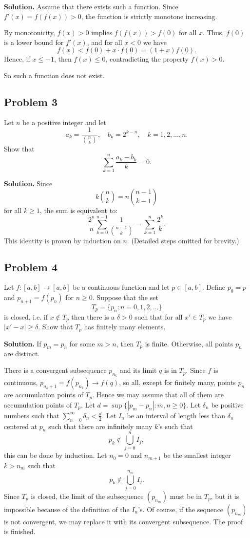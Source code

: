 \documentclass{article}
\begin{document}
\textbf{Solution.}
Assume that there exists such a function. Since $f'(x) = f(f(x)) > 0$,
the function is strictly monotone increasing.

By monotonicity, $f(x) > 0$ implies $f(f(x)) > f(0)$ for all $x$.
Thus, $f(0)$ is a lower bound for $f'(x)$, and for all $x < 0$ we have
\[
f(x) < f(0) + x \cdot f(0) = (1 + x)f(0).
\]
Hence, if $x \leq -1$, then $f(x) \leq 0$, contradicting the property $f(x) > 0$.

So such a function does not exist.

\subsection*{Problem 3}
Let $n$ be a positive integer and let
\[
a_k = \frac{1}{\binom{n}{k}}, \quad b_k = 2^{k-n}, \quad k = 1, 2, \ldots, n.
\]
Show that
\[
\sum_{k=1}^{n} \frac{a_k - b_k}{k} = 0.
\]

\textbf{Solution.}
Since
\[
k \binom{n}{k} = n \binom{n-1}{k-1}
\]
for all $k \geq 1$, the sum is equivalent to:
\[
\frac{2^n}{n} \sum_{k=0}^{n-1} \frac{1}{\binom{n-1}{k}} = \sum_{k=1}^{n} \frac{2^k}{k}.
\]
This identity is proven by induction on $n$. (Detailed steps omitted for brevity.)

\subsection*{Problem 4}
Let $f: [a, b] \to [a, b]$ be a continuous function and let $p \in [a, b]$.
Define $p_0 = p$ and $p_{n+1} = f(p_n)$ for $n \geq 0$. Suppose that the set
\[
T_p = \{p_n : n = 0, 1, 2, \ldots\}
\]
is closed, i.e. if $x \notin T_p$ then there is a $\delta > 0$ such
that for all $ x' \in T_p $ we have $|x'-x| \geq \delta $.
Show that $T_p$ has finitely many elements.

\textbf{Solution.}
If $p_m = p_n$ for some $m > n$, then $T_p$ is finite. Otherwise, all points $p_n$ are distinct.

There is a convergent subsequence \(p_{n_k}\) and its limit \(q\) is in \(T_p\).
Since \(f\) is continuous, \(p_{n_k+1} = f(p_{n_k}) \to f(q)\), so all,
except for finitely many, points \(p_n\) are accumulation points of \(T_p\).
Hence we may assume that all of them are accumulation points of \(T_p\).
Let \(d = \sup \{|p_m - p_n| : m, n \geq 0\}\). Let \(\delta_n\) be
positive numbers such that \(\sum_{n=0}^{\infty} \delta_n < \frac{d}{2}\).
Let \(I_n\) be an interval of length less than \(\delta_n\) centered at \(p_n\) such that
there are infinitely many \(k\)'s such that
\[
p_k \notin \bigcup_{j=0}^{n} I_j,
\]
this can be done by induction. Let \(n_0 = 0\) and \(n_{m+1}\) be the smallest integer \(k > n_m\) such that
\[
p_k \notin \bigcup_{j=0}^{n_m} I_j.
\]
Since \(T_p\) is closed, the limit of the subsequence \((p_{n_m})\) must be in \(T_p\),
but it is impossible because of the definition of the \(I_n\)'s.
Of course, if the sequence \((p_{n_m})\) is not convergent, we may replace it with its convergent subsequence.
The proof is finished.
\end{document}
